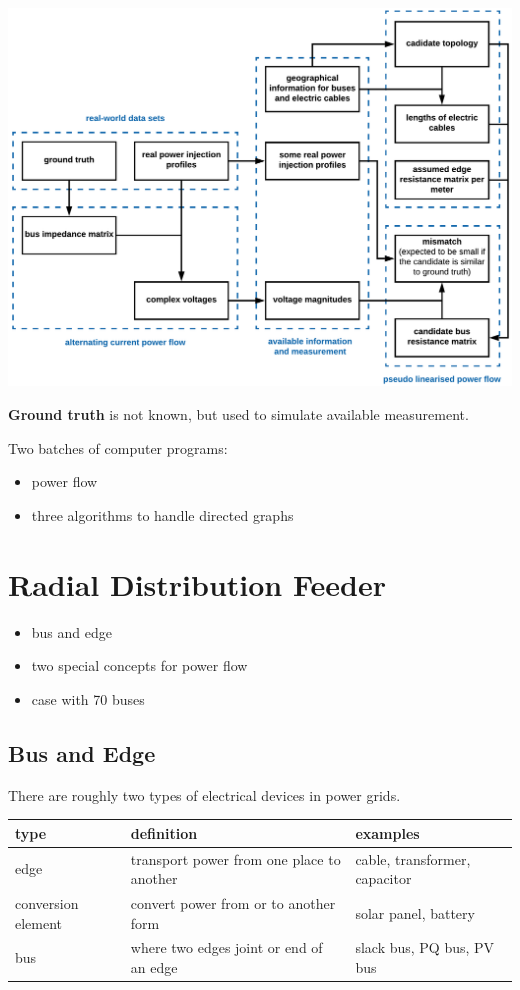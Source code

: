 \documentclass[
]{book}
\providecommand{\tightlist}{%
  \setlength{\itemsep}{0pt}\setlength{\parskip}{0pt}}
\begin{document}
\includegraphics{Pictures/figFlowchart3.png}

\textbf{Ground truth} is not known, but used to simulate available measurement.

Two batches of computer programs:

\begin{itemize}
\tightlist
\item
  power flow
\item
  three algorithms to handle directed graphs
\end{itemize}

\hypertarget{radial-distribution-feeder}{%
\chapter{Radial Distribution Feeder}\label{radial-distribution-feeder}}

\begin{itemize}
\tightlist
\item
  bus and edge
\item
  two special concepts for power flow
\item
  case with 70 buses
\end{itemize}

\hypertarget{bus-edge}{%
\section{Bus and Edge}\label{bus-edge}}

There are roughly two types of electrical devices in power grids.

\begin{table}[H]
\centering
\begin{tabular}[t]{l|l|l}
\hline
type & definition & examples\\
\hline
edge & transport power from one place to another & cable, transformer, capacitor\\
\hline
conversion element & convert power from or to another form & solar panel, battery\\
\hline
bus & where two edges joint or end of an edge & slack bus, PQ bus, PV bus\\
\hline
\end{tabular}
\end{table}
\end{document}
